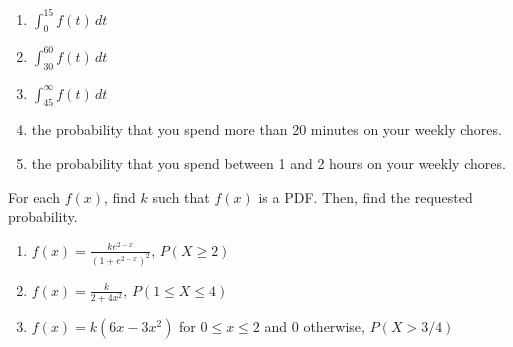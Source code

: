 \begin{Answer}[ref = rep_int]
\begin{enumerate}
\item $\int_0^{15} f(t)\,dt$
\item $\int_{30}^{60} f(t)\,dt$
\item $\int_{45}^{\infty} f(t)\,dt$
\item the probability that you spend more than 20 minutes on your weekly 
chores.
\item the probability that you spend between 1 and 2 hours on your weekly 
chores.
\end{enumerate}
\end{Answer}

\begin{Exercise}[title = {Using PDFs to Find Probabilities}, label = int_pdf]
For each $f(x)$, find $k$ such that $f(x)$ is a PDF. Then, find the requested 
probability. 
\begin{enumerate}
\item $f(x) = \frac{ke^{2 - x}}{\left(1 + e^{2 - x} \right)^2}$, $P(X \geq 2)$
\item $f(x) = \frac{k}{2 + 4x^2}$, $P(1 \leq X \leq 4)$
\item $f(x) = k(6x - 3x^2)$ for $0 \leq x \leq 2$ and 0 otherwise, $P(X > 3/4)$
\vspace{75mm}
\end{enumerate}
\end{Exercise}

